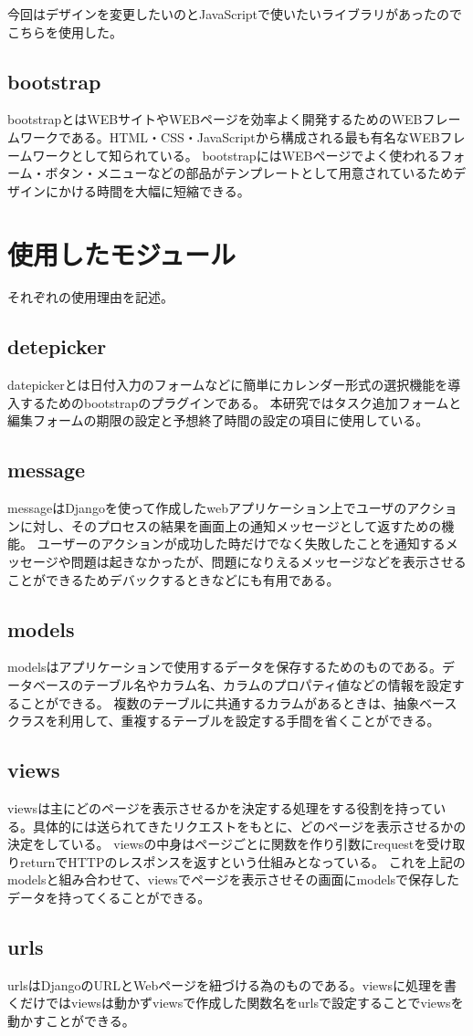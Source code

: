 今回はデザインを変更したいのとJavaScriptで使いたいライブラリがあったのでこちらを使用した。

\newpage
\subsection{bootstrap}
bootstrap\cite{bootstrap}とはWEBサイトやWEBページを効率よく開発するためのWEBフレームワークである。HTML・CSS・JavaScriptから構成される最も有名なWEBフレームワークとして知られている。
bootstrapにはWEBページでよく使われるフォーム・ボタン・メニューなどの部品がテンプレートとして用意されているためデザインにかける時間を大幅に短縮できる。
\section{使用したモジュール}
それぞれの使用理由を記述。

\subsection{detepicker}
datepicker\cite{datepicker}とは日付入力のフォームなどに簡単にカレンダー形式の選択機能を導入するためのbootstrapのプラグインである。
本研究ではタスク追加フォームと編集フォームの期限の設定と予想終了時間の設定の項目に使用している。

\subsection{message}
message\cite{message}はDjangoを使って作成したwebアプリケーション上でユーザのアクションに対し、そのプロセスの結果を画面上の通知メッセージとして返すための機能。
ユーザーのアクションが成功した時だけでなく失敗したことを通知するメッセージや問題は起きなかったが、問題になりえるメッセージなどを表示させることができるためデバックするときなどにも有用である。

\subsection{models}
models\cite{models}はアプリケーションで使用するデータを保存するためのものである。データベースのテーブル名やカラム名、カラムのプロパティ値などの情報を設定することができる。
複数のテーブルに共通するカラムがあるときは、抽象ベースクラスを利用して、重複するテーブルを設定する手間を省くことができる。

\subsection{views}
views\cite{views}は主にどのページを表示させるかを決定する処理をする役割を持っている。具体的には送られてきたリクエストをもとに、どのページを表示させるかの決定をしている。
viewsの中身はページごとに関数を作り引数にrequestを受け取りreturnでHTTPのレスポンスを返すという仕組みとなっている。
これを上記のmodelsと組み合わせて、viewsでページを表示させその画面にmodelsで保存したデータを持ってくることができる。

\subsection{urls}
urls\cite{urls}はDjangoのURLとWebページを紐づける為のものである。viewsに処理を書くだけではviewsは動かずviewsで作成した関数名をurlsで設定することでviewsを動かすことができる。